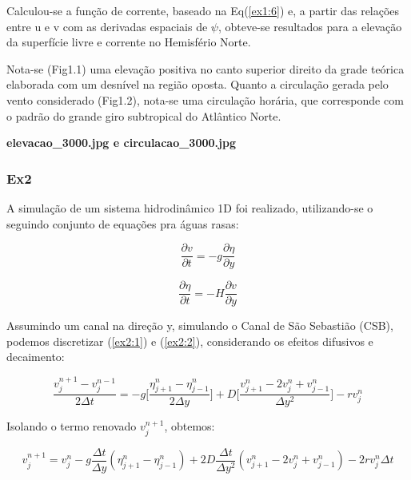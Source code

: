 \documentclass[11pt]{article}
\begin{document}
Calculou-se a função de corrente, baseado na Eq(\ref{ex1:6}) e, a partir
das relações entre u e v com as derivadas espaciais de \(\psi\),
obteve-se resultados para a elevação da superfície livre e corrente no
Hemisfério Norte.

Nota-se (Fig1.1) uma elevação positiva no canto superior direito da
grade teórica elaborada com um desnível na região oposta. Quanto a
circulação gerada pelo vento considerado (Fig1.2), nota-se uma
circulação horária, que corresponde com o padrão do grande giro
subtropical do Atlântico Norte.

\textbf{elevacao\_3000.jpg e circulacao\_3000.jpg}

    \subsubsection{Ex2}\label{ex2}

A simulação de um sistema hidrodinâmico 1D foi realizado, utilizando-se
o seguindo conjunto de equações pra águas rasas:

\begin{equation}
    \frac{\partial{v}}{\partial{t}} = - g\frac{\partial{\eta}}{\partial{y}}
    \label{ex2:1}
\end{equation}

\begin{equation}
    \frac{\partial{\eta}}{\partial{t}} = -H\frac{\partial{v}}{\partial{y}}
    \label{ex2:2}
\end{equation}

Assumindo um canal na direção y, simulando o Canal de São Sebastião
(CSB), podemos discretizar (\ref{ex2:1}) e (\ref{ex2:2}), considerando
os efeitos difusivos e decaimento:

\begin{equation}
    \frac{v^{n+1}_{j} - v^{n-1}_{j}}{2\Delta{t}} = -g\bigg[ \frac{\eta^{n}_{j+1}  - \eta^{n}_{j-1}}{2\Delta{y}} \bigg] + D\bigg[ \frac{v^{n}_{j+1} - 2v^{n}_{j} + v^{n}_{j-1}}{\Delta{y^2}} \bigg] - rv^{n}_{j}
    \label{ex2:3}
\end{equation}

Isolando o termo renovado \(v^{n+1}_{j}\), obtemos:

\begin{equation}
    v^{n+1}_{j} = v^{n}_{j} - g\frac{\Delta{t}}{\Delta{y}}(\eta^{n}_{j+1} - \eta^{n}_{j-1}) + 2D\frac{\Delta{t}}{\Delta{y^2}}(v^{n}_{j+1} - 2v^{n}_{j} + v^{n}_{j-1}) - 2rv^{n}_{j}\Delta{t} 
    \label{ex2:4}
\end{equation}
\end{document}
